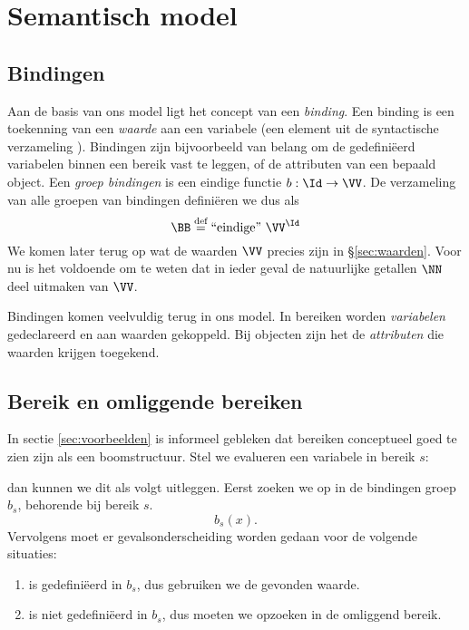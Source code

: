\chapter{Semantisch model}

\section{Bindingen}\label{sec:bindingen}

Aan de basis van ons model ligt het concept van een \emph{binding}. Een binding is een toekenning van een \emph{waarde} aan een variabele (een element uit de syntactische verzameling \Id). Bindingen zijn bijvoorbeeld van belang om de gedefiniëerd variabelen binnen een bereik vast te leggen, of de attributen van een bepaald object. Een \emph{groep bindingen} is een eindige functie $b : \Id \to \VV$. De verzameling van alle groepen van bindingen definiëren we dus als
\begin{equation*}
  \BB \DEF \FiniteFunctions{\VV}{\Id}
\end{equation*}
We komen later terug op wat de waarden $\VV$ precies zijn in §\ref{sec:waarden}. Voor nu is het voldoende om te weten dat in ieder geval de natuurlijke getallen $\NN$ deel uitmaken van $\VV$.

Bindingen komen veelvuldig terug in ons model. In bereiken worden \emph{variabelen} gedeclareerd en aan waarden gekoppeld. Bij objecten zijn het de \emph{attributen} die waarden krijgen toegekend.

\section{Bereik en omliggende bereiken}\label{sec:bereiken}

In sectie \ref{sec:voorbeelden} is informeel gebleken dat bereiken conceptueel goed te zien zijn als een boomstructuur. Stel we evalueren een variabele  in bereik $s$:

\newCodeFragment
{}

dan kunnen we dit als volgt uitleggen. Eerst zoeken we  op in de bindingen groep $b_s$, behorende bij bereik $s$.
%
\begin{equation*}
  b_s(x).
\end{equation*}
%
Vervolgens moet er gevalsonderscheiding worden gedaan voor de volgende situaties:

\begin{enumerate}
  \item {} is gedefiniëerd in $b_s$, dus gebruiken we de gevonden waarde.
  \item {} is niet gedefiniëerd in $b_s$, dus moeten we  opzoeken in de omliggend bereik.
\end{enumerate}

